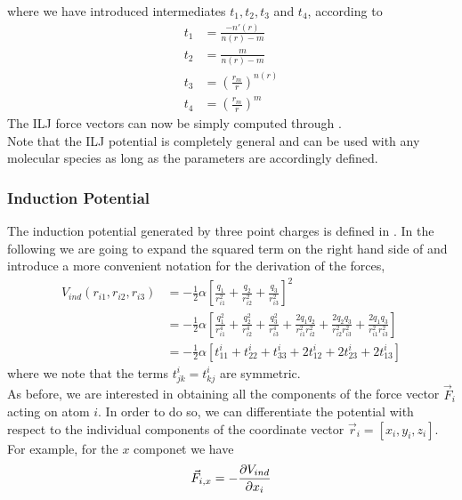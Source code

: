 \documentclass[utf8]{article}
\begin{document}
%
where we have introduced intermediates $t_1, t_2, t_3$ and $t_4$, according to
%
\begin{align}
    t_1 &= \frac{-n'(r)}{n(r)-m} \\
    t_2 &= \frac{m}{n(r)-m} \\
    t_3 &= \left( \frac{r_m}{r} \right)^{n(r)} \\
    t_4 &= \left( \frac{r_m}{r} \right)^m
\end{align}
%
The ILJ force vectors can now be simply computed through .\\
Note that the ILJ potential is completely general and can be used with any molecular
species as long as the parameters are accordingly defined.

\subsubsection{Induction Potential}
The induction potential generated by three point charges is defined in .
In the following we are going to expand the squared term on the right hand side of
 and introduce a more convenient notation for the derivation of the forces,
%
\begin{equation}\label{eq:V_ind_simple}
    \begin{aligned}
        V_{ind}(r_{i1},r_{i2},r_{i3}) &= - \frac{1}{2} \alpha \left[ 
            \frac{q_1}{r_{i1}^2} + \frac{q_2}{r_{i2}^2} + \frac{q_3}{r_{i3}^2} \right]^2 \\
            &= - \frac{1}{2} \alpha \left[ \frac{q_1^2}{r_{i1}^4} + \frac{q_2^2}{r_{i2}^4}
            + \frac{q_3^2}{r_{i3}^4} + \frac{2q_1 q_2}{r_{i1}^2 r_{i2}^2}
            + \frac{2q_2 q_3}{r_{i2}^2 r_{i3}^2} + \frac{2q_1 q_3}{r_{i1}^2 r_{i3}^2} \right] \\
            &= - \frac{1}{2} \alpha \left[ t^i_{11} + t^i_{22} + t^i_{33}
            + 2t^i_{12} + 2t^i_{23} + 2t^i_{13} \right]
    \end{aligned}
\end{equation}
%
where we note that the terms $t^i_{jk} = t^i_{kj}$ are symmetric.\\
As before, we are interested in obtaining all the components of the force vector $\vec{F}_i$
acting on atom $i$. In order to do so, we can differentiate the potential with respect to the
individual components of the coordinate vector $\vec{r}_i = [x_i, y_i, z_i]$.
For example, for the $x$ componet we have
%
\begin{equation}
    \vec{F}_{i,x} = - \frac{\partial V_{ind}}{\partial x_i}
\end{equation}
\end{document}
